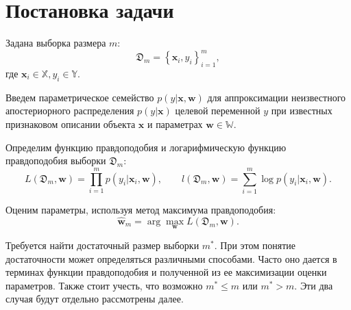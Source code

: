 \chapter{Постановка задачи}\label{chap1}

Задана выборка размера $m$:
\[ \mathfrak{D}_m = \left\{ \mathbf{x}_i, y_i \right\}_{i = 1}^{m}, \]
где $\mathbf{x}_i \in \mathbb{X}, y_i \in \mathbb{Y}$.

Введем параметрическое семейство $p(y | \mathbf{x}, \mathbf{w})$ для аппроксимации неизвестного апостериорного распределения $p(y | \mathbf{x})$ целевой переменной $y$ при известных признаковом описании объекта $\mathbf{x}$ и параметрах $\mathbf{w} \in \mathbb{W}$. 

Определим функцию правдоподобия и логарифмическую функцию правдоподобия выборки $\mathfrak{D}_m$:
\[ L(\mathfrak{D}_m, \mathbf{w}) = \prod_{i=1}^{m} p(y_i | \mathbf{x}_i, \mathbf{w}), \qquad l(\mathfrak{D}_m, \mathbf{w}) = \sum\limits_{i=1}^{m} \log p(y_i | \mathbf{x}_i, \mathbf{w}). \]

Оценим параметры, используя метод максимума правдоподобия:
\[ \hat{\mathbf{w}}_{m} = \arg\max_{\mathbf{w}} L(\mathfrak{D}_m, \mathbf{w}). \]

Требуется найти достаточный размер выборки $m^*$. При этом понятие достаточности может определяться различными способами. Часто оно дается в терминах функции правдоподобия и полученной из ее максимизации оценки параметров. Также стоит учесть, что возможно $m^* \leqslant m$ или $m^* > m$. Эти два случая будут отдельно рассмотрены далее.